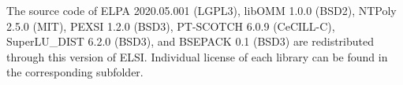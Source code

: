 \documentclass{report}
\begin{document}
The source code of ELPA 2020.05.001 (LGPL3), libOMM 1.0.0 (BSD2), NTPoly 2.5.0 (MIT), PEXSI 1.2.0 (BSD3), PT-SCOTCH 6.0.9 (CeCILL-C), SuperLU\_DIST 6.2.0 (BSD3), and BSEPACK 0.1 (BSD3) are redistributed through this version of ELSI. Individual license of each library can be found in the corresponding subfolder.
\end{document}

